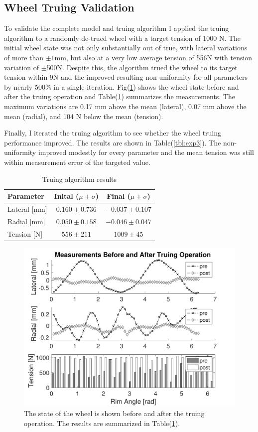 \documentclass[journal]{IEEEtran}
\begin{document}
\subsection{Wheel Truing Validation}
To validate the complete model and truing algorithm I applied the truing algorithm to a randomly de-trued wheel with a target tension of 1000 N. The initial wheel state was not only substantially out of true, with lateral variations of more than $\pm1$mm, but also at a very low average tension of 556N with tension variation of $\pm$500N.  Despite  this, the algorithm trued the wheel to its target tension within 9N and the improved resulting non-uniformity for all parameters by nearly 500\% in a single iteration. Fig(\ref{fig:exp2}) shows the wheel state before and after the truing operation and Table(\ref{tbl:exp2}) summarizes the measurements. The maximum variations are 0.17 mm above the mean (lateral), 0.07 mm above the mean (radial), and 104 N below the mean (tension). 

Finally, I iterated the truing algorithm to see whether the wheel truing performance improved.  The results are shown in Table(\ref{tbl:exp3}). The non-uniformity improved modestly for every parameter and the mean tension was still within measurement error of the targeted value. 

\begin{table}[!t]
\caption{Truing algorithm results}
\label{tbl:exp2}
\centering
\begin{tabular}{| l | c | c |}
    \hline
    Parameter & Inital ($\mu \pm \sigma$) & Final ($\mu \pm \sigma$)\\ \hline
    Lateral [mm] & $0.160\pm0.736$ &$-0.037\pm 0.107$ \\ \hline 
    Radial [mm] &$0.050\pm0.158$& $-0.046\pm0.047$ \\ \hline 
    Tension [N] &$556\pm211$& $1009\pm45$ \\ \hline
\end{tabular}
\end{table}

\begin{figure}[!t]
\centering
\includegraphics[width=3.25 in]{./figs/exp2}
\caption{The state of the wheel is shown before and after the truing operation. The results are summarized in Table(\ref{tbl:exp2}).}
\label{fig:exp2}
\end{figure}
\end{document}
